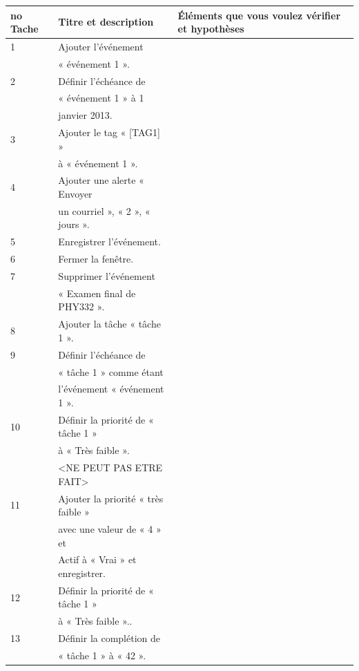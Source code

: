 \documentclass[letterpaper, oneside, 12pt, these, creativecommons]{thETS}
\begin{document}
\begin{table}
	\centering
	\begin{tabular}{|l|l|l|}
		\hline
		no Tache	& Titre et description		& Éléments que vous voulez vérifier et hypothèses 	\\ \hline 
		1		& Ajouter l'événement 		&  							\\ 
				& « événement 1 ».			&							\\ \hline
		2		& Définir l’échéance de 		&							\\
				& « événement 1 » à 1 		&							\\
				& janvier 2013.			&							\\ \hline
		3		& Ajouter le tag « [TAG1] » 	&							\\
				& à « événement 1 ».		&							\\ \hline
		4		& Ajouter une alerte « Envoyer 	&							\\
				& un courriel », « 2 », « jours ».	&							\\ \hline
		5		& Enregistrer l’événement.	& 							\\ \hline
		6		& Fermer la fenêtre.		&							\\ \hline
		7		& Supprimer l’événement		&							\\
				&  « Examen final de PHY332 ».	& 							\\ \hline
		8		& Ajouter la tâche « tâche 1 ». 	&							\\ \hline
		9		& Définir l’échéance de  		&							\\
				& « tâche 1 » comme étant	&							\\
				&  l’événement « événement 1 ».	&							\\ \hline
		10		& Définir la priorité de  « tâche 1 »&							\\
				&  à « Très faible ». 		&							\\
				& <NE PEUT PAS ETRE FAIT>	&							\\ \hline
		11		& Ajouter la priorité « très faible »&							\\
				& avec une valeur de « 4 » et 	&							\\
				& Actif à « Vrai » et enregistrer.	&							\\ \hline
		12		& Définir la priorité de  « tâche 1 »&							\\
				&  à « Très faible »..		&							\\ \hline
		13		& Définir la complétion de 		&							\\
				& « tâche 1 » à « 42 ».		&							\\ \hline

\end{tabular}
\end{table}
\end{document}
